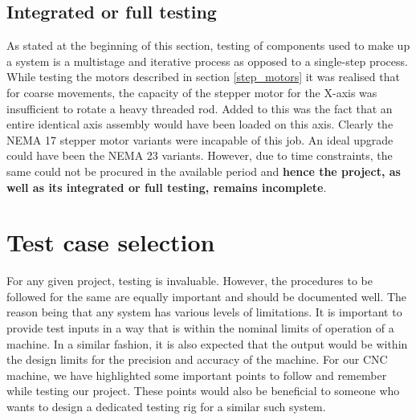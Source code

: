 \subsection{Integrated or full testing}

As stated at the beginning of this section, testing of components used to make up a system is a multistage and iterative process as opposed to a single-step process. While testing the motors described in section \ref{step_motors} it was realised that for coarse movements, the capacity of the stepper motor for the X-axis was insufficient to rotate a heavy threaded rod. Added to this was the fact that an entire identical axis assembly would have been loaded on this axis. Clearly the NEMA 17 stepper motor variants were incapable of this job. An ideal upgrade could have been the NEMA 23 variants. However, due to time constraints, the same could not be procured in the available period and \textbf{hence the project, as well as its integrated or full testing, remains incomplete}.

\section{Test case selection}

For any given project, testing is invaluable. However, the procedures to be followed for the same are equally important and should be documented well. The reason being that any system has various levels of limitations. It is important to provide test inputs in a way that is within the nominal limits of operation of a machine. In a similar fashion, it is also expected that the output would be within the design limits for the precision and accuracy of the machine. For our CNC machine, we have highlighted some important points to follow and remember while testing our project. These points would also be beneficial to someone who wants to design a dedicated testing rig for a similar such system.

